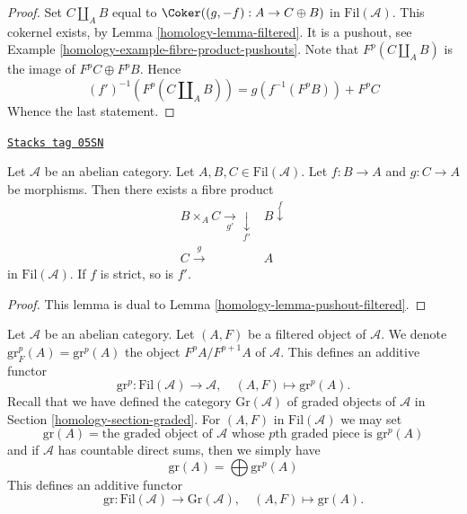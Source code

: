 \begin{proof}

Set $C \amalg_A B$ equal to $\Coker((g, -f) : A \to C \oplus B)$
in $\text{Fil}(\mathcal{A})$. This cokernel exists, by
Lemma \ref{homology-lemma-filtered}.
It is a pushout, see
Example \ref{homology-example-fibre-product-pushouts}.
Note that $F^p(C \amalg_A B)$ is the image of $F^pC \oplus F^pB$.
Hence
$$
(f')^{-1}(F^p(C \amalg_A B)) = g(f^{-1}(F^pB)) + F^pC
$$
Whence the last statement.
\end{proof}

\begin{lemma}
\label{homology-lemma-fibre-product-filtered}
\href{https://stacks.math.columbia.edu/tag/05SN}{\texttt{Stacks tag 05SN}}

Let $\mathcal{A}$ be an abelian category.
Let $A, B, C \in \text{Fil}(\mathcal{A})$.
Let $f : B \to A$ and $g : C \to A$ be morphisms.
Then there exists a fibre product
$$
\begin{array}{cc}B \times_A C \underset{g'}{\longrightarrow}\underset{f'}{\downarrow} & B \overset{f}{\downarrow} \\ C \overset{g}{\longrightarrow} & A\end{array}
$$
in $\text{Fil}(\mathcal{A})$. If $f$ is strict, so is $f'$.
\end{lemma}

\begin{proof}

This lemma is dual to
Lemma \ref{homology-lemma-pushout-filtered}.
\end{proof}

Let $\mathcal{A}$ be an abelian category. Let $(A, F)$ be a filtered
object of $\mathcal{A}$. We denote $\text{gr}^p_F(A) = \text{gr}^p(A)$
the object $F^pA/F^{p + 1}A$ of $\mathcal{A}$. This defines an
additive functor
$$
\text{gr}^p :
\text{Fil}(\mathcal{A})
\longrightarrow
\mathcal{A}, \quad
(A, F)
\longmapsto
\text{gr}^p(A).
$$
Recall that we have defined the category $\text{Gr}(\mathcal{A})$
of graded objects of $\mathcal{A}$ in Section \ref{homology-section-graded}.
For $(A, F)$ in $\text{Fil}(\mathcal{A})$ we may set
$$
\text{gr}(A) = \text{the graded object of }\mathcal{A}\text{ whose }
p\text{th graded piece is }\text{gr}^p(A)
$$
and if $\mathcal{A}$ has countable direct sums, then we simply have
$$
\text{gr}(A) = \bigoplus \text{gr}^p(A)
$$
This defines an additive functor
$$
\text{gr} :
\text{Fil}(\mathcal{A})
\longrightarrow
\text{Gr}(\mathcal{A}), \quad
(A, F) \longmapsto \text{gr}(A).
$$


